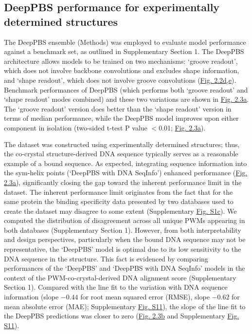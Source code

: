 \subsection{DeepPBS performance for experimentally determined structures}
The DeepPBS ensemble (Methods) was employed to evaluate model performance against a benchmark set, as outlined in Supplementary Section 1. The DeepPBS architecture allows models to be trained on two mechanisms: ‘groove readout’, which does not involve backbone convolutions and excludes shape information, and ‘shape readout’, which does not involve groove convolutions (\hyperref[fig:pdna1]{Fig. 2.2d,e}). Benchmark performances of DeepPBS (which performs both ‘groove readout’ and ‘shape readout’ modes combined) and these two variations are shown in \hyperref[fig:pdna2]{Fig. 2.3a}. The ‘groove readout’ version does better than the ‘shape readout’ version in terms of median performance, while the DeepPBS model improves upon either component in isolation (two-sided t-test P value $<$0.01; \hyperref[fig:pdna2]{Fig. 2.3a}). 
\par
The dataset was constructed using experimentally determined structures; thus, the co-crystal structure-derived DNA sequence typically serves as a reasonable example of a bound sequence. As expected, integrating sequence information into the sym-helix points (‘DeepPBS with DNA SeqInfo’) enhanced performance (\hyperref[fig:pdna2]{Fig. 2.3a}), significantly closing the gap toward the inherent performance limit in the dataset. The inherent performance limit originates from the fact that for the same protein the binding specificity data presented by two databases \citep{Jaime2022, kulakovskiy2018hocomoco} used to create the dataset may disagree to some extent (Supplementary \hyperref[fig:pdnaS1]{Fig. S1c}). We computed the distribution of disagreement across all unique PWMs appearing in both databases (Supplementary Section 1). However, from both interpretability and design perspectives, particularly when the bound DNA sequence may not be representative, the ‘DeepPBS’ model is optimal due to its low sensitivity to the DNA sequence in the structure. This fact is evidenced by comparing performances of the ‘DeepPBS’ and ‘DeepPBS with DNA SeqInfo’ models in the context of the PWM-co-crystal-derived DNA alignment score (Supplementary Section 1). Compared with the line fit to the variation with DNA sequence information (slope $-0.44$ for root mean squared error (RMSE), slope $-0.62$ for mean absolute error (MAE); Supplementary \hyperref[fig:pdnaS11]{Fig. S11}), the slope of the line fit to the DeepPBS predictions was closer to zero (\hyperref[fig:pdna2]{Fig. 2.3b} and Supplementary \hyperref[fig:pdnaS11]{Fig. S11}).

